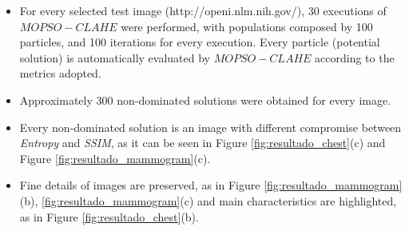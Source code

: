 \documentclass[a0,landscape,spanish,20pt]{a0poster}
\begin{document}
\begin{multicols}{3}
{ \Large

\begin{itemize}

\item For every selected test image (http://openi.nlm.nih.gov/), 30 executions of $MOPSO-CLAHE$ were performed, with populations composed by 100 particles, and 100 iterations for every execution. Every particle (potential solution) is automatically evaluated by $MOPSO-CLAHE$ according to the metrics adopted.
\item Approximately 300 non-dominated solutions were obtained for every image.
\item Every non-dominated solution is an image with different compromise between \textit{Entropy} and \textit{SSIM}, as it can be seen in Figure \ref{fig:resultado_chest}(c) and Figure \ref{fig:resultado_mammogram}(c).
\item Fine details of images are preserved, as in Figure \ref{fig:resultado_mammogram}(b), \ref{fig:resultado_mammogram}(c)  and main characteristics are highlighted, as in Figure \ref{fig:resultado_chest}(b). 

\end{itemize}

}

\begin{figure}[H]
\centering
{}
\hspace{1pt}
 \\[5pt]


\end{figure}
\end{multicols}
\end{document}
